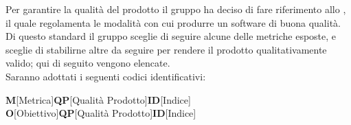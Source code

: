 \documentclass[../piano_di_qualifica.tex]{subfiles}
\begin{document}
Per garantire la qualità del prodotto il gruppo ha deciso di fare riferimento allo , il quale regolamenta le modalità con cui produrre un software di buona qualità. Di questo standard il gruppo sceglie di seguire alcune delle metriche esposte, e sceglie di stabilirne altre da seguire per rendere il prodotto qualitativamente valido; qui di seguito vengono elencate. \\
Saranno adottati i seguenti codici identificativi:\par

\begin{center}
	\textbf{M}[Metrica]\textbf{QP}[Qualità Prodotto]\textbf{ID}[Indice]\\
	\textbf{O}[Obiettivo]\textbf{QP}[Qualità Prodotto]\textbf{ID}[Indice]
\end{center}
\end{document}
